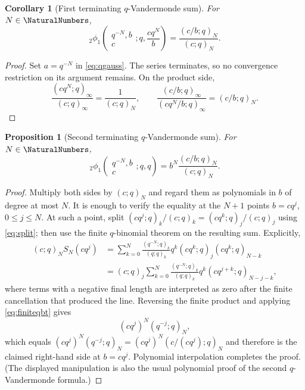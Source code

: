 \documentclass[11pt]{article}
\numberwithin{equation}{section}
\newtheorem{proposition}[theorem]{Proposition}
\newtheorem{corollary}[theorem]{Corollary}
\theoremstyle{definition}
\theoremstyle{remark}
\begin{document}
\begin{corollary}[First terminating $q$-Vandermonde sum]\label{cor:qvand1}
For $N\in\NaturalNumbers$,
\begin{equation}\label{eq:qvand1}
{}_2\phi_1\!\left(\begin{matrix}q^{-N},b\\c\end{matrix};q,
\frac{cq^N}{b}\right)
=\frac{(c/b;q)_N}{(c;q)_N}.
\end{equation}
\end{corollary}
\begin{proof}
Set $a=q^{-N}$ in \eqref{eq:qgauss}.  The series terminates, so no
convergence restriction on its argument remains.  On the product side,
\[
\frac{(cq^N;q)_\infty}{(c;q)_\infty}=\frac1{(c;q)_N},\qquad
\frac{(c/b;q)_\infty}{(cq^N/b;q)_\infty}=(c/b;q)_N.
\]
\end{proof}

\begin{proposition}[Second terminating $q$-Vandermonde sum]\label{prop:qvand2}
For $N\in\NaturalNumbers$,
\begin{equation}\label{eq:qvand2}
{}_2\phi_1\!\left(\begin{matrix}q^{-N},b\\c\end{matrix};q,q\right)
=b^N\frac{(c/b;q)_N}{(c;q)_N}.
\end{equation}
\end{proposition}
\begin{proof}
Multiply both sides by $(c;q)_N$ and regard them as polynomials in $b$ of
degree at most $N$.  It is enough to verify the equality at the $N+1$ points
$b=cq^j$, $0\le j\le N$.  At such a point, split
$(cq^j;q)_k/(c;q)_k=(cq^k;q)_j/(c;q)_j$ using \eqref{eq:split}; then use the
finite $q$-binomial theorem on the resulting sum.  Explicitly,
\begin{align*}
(c;q)_N S_N(cq^j)
&=\sum_{k=0}^N
 \frac{(q^{-N};q)_k}{(q;q)_k}q^k
 (cq^k;q)_j(cq^k;q)_{N-k}\\
&=(c;q)_j\sum_{k=0}^N
 \frac{(q^{-N};q)_k}{(q;q)_k}q^k
 (cq^{j+k};q)_{N-j-k},
\end{align*}
where terms with a negative final length are interpreted as zero after the
finite cancellation that produced the line.  Reversing the finite product
and applying \eqref{eq:finiteqbt} gives
\[
(cq^j)^N(q^{-j};q)_N,
\]
which equals $(cq^j)^N(q^{-j};q)_N=(cq^j)^N(c/(cq^j);q)_N$ and therefore is
the claimed right-hand side at $b=cq^j$.  Polynomial interpolation completes
the proof.  (The displayed manipulation is also the usual polynomial proof
of the second $q$-Vandermonde formula.)
\end{proof}
\end{document}
